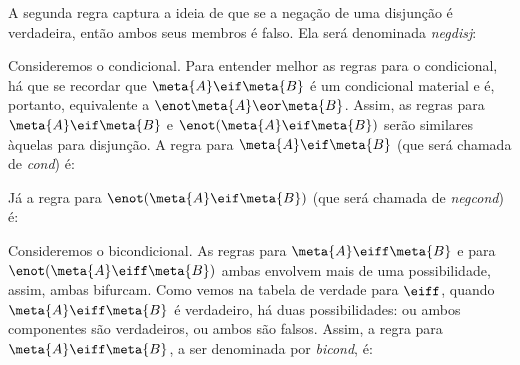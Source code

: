
A segunda regra captura a ideia de que se a negação de uma disjunção é verdadeira, então ambos seus membros é falso.
Ela será denominada \emph{negdisj}:


Consideremos o condicional.
Para entender melhor as regras para o condicional, há que se recordar que $\meta{A} \eif \meta{B}$ é um condicional material e é, portanto, equivalente a $\enot\meta{A} \eor \meta{B}$.
Assim, as regras para $\meta{A} \eif \meta{B}$ e $\enot(\meta{A} \eif \meta{B})$ serão similares àquelas para disjunção.
A regra para $\meta{A} \eif \meta{B}$ (que será chamada de \emph{cond}) é:


Já a regra para  $\enot(\meta{A} \eif \meta{B})$ (que será chamada de \emph{negcond}) é:


Consideremos o bicondicional.
As regras para $\meta{A} \eiff \meta{B}$ e para $\enot(\meta{A} \eiff \meta{B})$ ambas envolvem mais de uma possibilidade, assim, ambas bifurcam.
Como vemos na tabela de verdade para $\eiff$, quando $\meta{A} \eiff \meta{B}$ é verdadeiro, há duas possibilidades: ou ambos componentes são verdadeiros, ou ambos são falsos.
Assim, a regra para $\meta{A} \eiff \meta{B}$, a ser denominada por \emph{bicond}, é:


